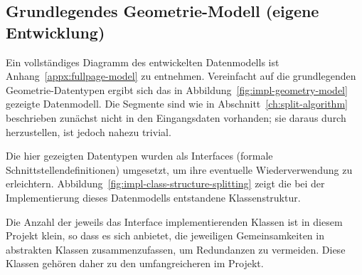\documentclass[../main/thesis.tex]{subfiles}
\begin{document}
\subsection{Grundlegendes Geometrie-Modell (eigene Entwicklung)}

Ein vollständiges Diagramm des entwickelten Datenmodells ist Anhang~\ref{appx:fullpage-model} zu entnehmen.
Vereinfacht auf die grundlegenden Geometrie-Datentypen ergibt sich das in Abbildung~\ref{fig:impl-geometry-model} gezeigte Datenmodell.
Die Segmente sind wie in Abschnitt~\ref{ch:split-algorithm} beschrieben zunächst nicht in den Eingangsdaten vorhanden; sie daraus durch  herzustellen, ist jedoch nahezu trivial.



Die hier gezeigten Datentypen wurden als Interfaces (formale Schnittstellendefinitionen) umgesetzt, um ihre eventuelle Wiederverwendung zu erleichtern. 
Abbildung~\ref{fig:impl-class-structure-splitting} zeigt die bei der Implementierung dieses Datenmodells entstandene Klassenstruktur.


Die Anzahl der jeweils das Interface implementierenden Klassen ist in diesem Projekt klein, so dass es sich anbietet, die jeweiligen Gemeinsamkeiten in abstrakten Klassen
zusammenzufassen, um Redundanzen zu vermeiden.
Diese Klassen gehören daher zu den umfangreicheren im Projekt.
\end{document}

